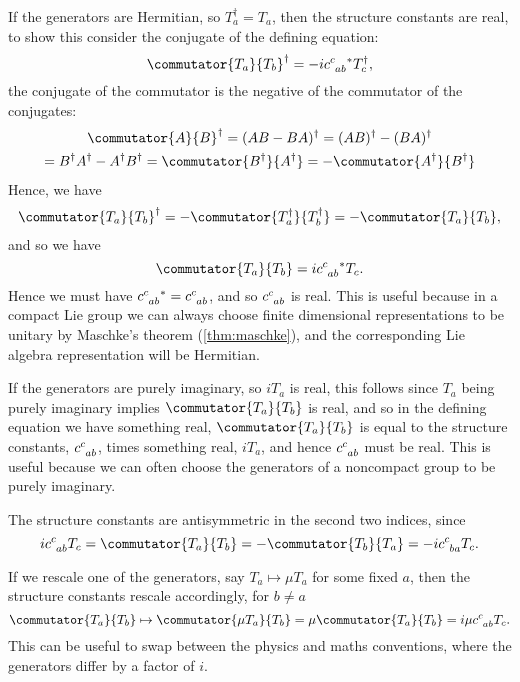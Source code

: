 \documentclass[fleqn]{NotesClass}
\newcommand{\hermit}{\dagger}
\begin{document}
    If the generators are Hermitian, so \(T_a^\hermit = T_a\), then the structure constants are real, to show this consider the conjugate of the defining equation:
    \begin{equation}
        \commutator{T_a}{T_b}^\hermit = -i\tensor{c}{^c_{ab}}^*T_c^\hermit,
    \end{equation}
    the conjugate of the commutator is the negative of the commutator of the conjugates:
    \begin{multline}
        \commutator{A}{B}^\hermit = (AB - BA)^\hermit = (AB)^\hermit - (BA)^\hermit\\
        = B^\hermit A^\hermit - A^\hermit B^\hermit = \commutator{B^\hermit}{A^\hermit} = -\commutator{A^\hermit}{B^\hermit}
    \end{multline}
    Hence, we have
    \begin{equation}
        \commutator{T_a}{T_b}^\hermit = -\commutator{T_a^\hermit}{T_b^\hermit} = -\commutator{T_a}{T_b},
    \end{equation}
    and so we have
    \begin{equation}
        \commutator{T_a}{T_b} = i\tensor{c}{^c_{ab}}^* T_c.
    \end{equation}
    Hence we must have \(\tensor{c}{^c_{ab}}^* = \tensor{c}{^c_{ab}}\), and so \(\tensor{c}{^c_{ab}}\) is real.
    This is useful because in a compact Lie group we can always choose finite dimensional representations to be unitary by Maschke's theorem (\cref{thm:maschke}), and the corresponding Lie algebra representation will be Hermitian.
    
    If the generators are purely imaginary, so \(iT_a\) is real, this follows since \(T_a\) being purely imaginary implies \(\commutator{T_a}{T_b}\) is real, and so in the defining equation we have something real, \(\commutator{T_a}{T_b}\) is equal to the structure constants, \(\tensor{c}{^c_{ab}}\), times something real, \(iT_a\), and hence \(\tensor{c}{^c_{ab}}\) must be real.
    This is useful because we can often choose the generators of a noncompact group to be purely imaginary.
    
    The structure constants are antisymmetric in the second two indices, since
    \begin{equation}
        i\tensor{c}{^c_{ab}}T_c = \commutator{T_a}{T_b} = -\commutator{T_b}{T_a} = -i\tensor{c}{^c_{ba}}T_c.
    \end{equation}
    
    If we rescale one of the generators, say \(T_a \mapsto \mu T_a\) for some fixed \(a\), then the structure constants rescale accordingly, for \(b \ne a\)
    \begin{equation}
        \commutator{T_a}{T_b} \mapsto \commutator{\mu T_a}{T_b} = \mu\commutator{T_a}{T_b} = i\mu\tensor{c}{^c_{ab}}T_c.
    \end{equation}
    This can be useful to swap between the physics and maths conventions, where the generators differ by a factor of \(i\).
    
\end{document}
